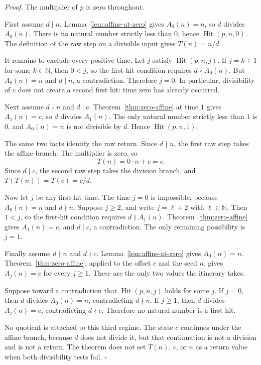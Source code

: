 \documentclass[11pt,letterpaper]{article}
\newcommand{\N}{\mathbb{N}}
\newenvironment{proof}{\noindent\textit{Proof.}}{\hfill\(\square\)}
\begin{document}
\begin{proof}
The multiplier of \(p\) is zero throughout.

First assume \(d\mid n\). Lemma~\ref{lem:affine-at-zero} gives \(A_0(n)=n\), so \(d\) divides \(A_0(n)\). There is no natural number strictly less than \(0\), hence \(\operatorname{Hit}(p,n,0)\). The definition of the raw step on a divisible input gives \(T(n)=n/d\).

It remains to exclude every positive time. Let \(j\) satisfy \(\operatorname{Hit}(p,n,j)\). If \(j=k+1\) for some \(k\in\N\), then \(0<j\), so the first-hit condition requires \(d\nmid A_0(n)\). But \(A_0(n)=n\) and \(d\mid n\), a contradiction. Therefore \(j=0\). In particular, divisibility of \(c\) does not create a second first hit: time zero has already occurred.

Next assume \(d\nmid n\) and \(d\mid c\). Theorem~\ref{thm:zero-affine} at time \(1\) gives \(A_1(n)=c\), so \(d\) divides \(A_1(n)\). The only natural number strictly less than \(1\) is \(0\), and \(A_0(n)=n\) is not divisible by \(d\). Hence \(\operatorname{Hit}(p,n,1)\).

The same two facts identify the raw return. Since \(d\nmid n\), the first raw step takes the affine branch. The multiplier is zero, so
\[
T(n)=0\cdot n+c=c.
\]
Since \(d\mid c\), the second raw step takes the division branch, and \(T(T(n))=T(c)=c/d\).

Now let \(j\) be any first-hit time. The time \(j=0\) is impossible, because \(A_0(n)=n\) and \(d\nmid n\). Suppose \(j\ge 2\), and write \(j=\ell+2\) with \(\ell\in\N\). Then \(1<j\), so the first-hit condition requires \(d\nmid A_1(n)\). Theorem~\ref{thm:zero-affine} gives \(A_1(n)=c\), and \(d\mid c\), a contradiction. The only remaining possibility is \(j=1\).

Finally assume \(d\nmid n\) and \(d\nmid c\). Lemma~\ref{lem:affine-at-zero} gives \(A_0(n)=n\). Theorem~\ref{thm:zero-affine}, applied to the offset \(c\) and the seed \(n\), gives \(A_j(n)=c\) for every \(j\ge 1\). These are the only two values the itinerary takes.

Suppose toward a contradiction that \(\operatorname{Hit}(p,n,j)\) holds for some \(j\). If \(j=0\), then \(d\) divides \(A_0(n)=n\), contradicting \(d\nmid n\). If \(j\ge 1\), then \(d\) divides \(A_j(n)=c\), contradicting \(d\nmid c\). Therefore no natural number is a first hit.

No quotient is attached to this third regime. The state \(c\) continues under the affine branch, because \(d\) does not divide it, but that continuation is not a division and is not a return. The theorem does not set \(T(n)\), \(c\), or \(n\) as a return value when both divisibility tests fail.
\end{proof}
\end{document}
